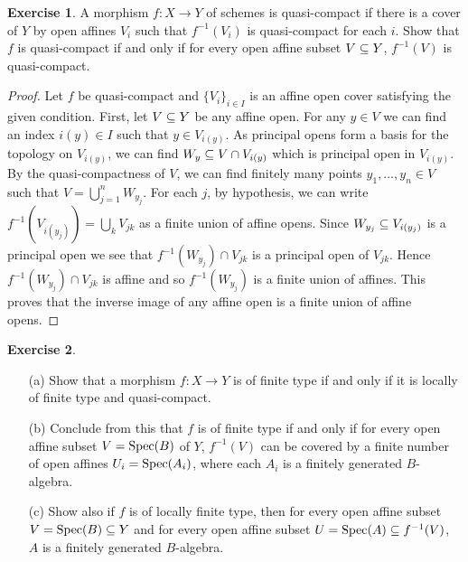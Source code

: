 \documentclass[11pt]{book}
\theoremstyle{definition}
\newtheorem{exercise}{Exercise}[section]
\begin{document}
\begin{exercise}
A morphism $f:X\to Y$ of schemes is quasi-compact if there is a cover of $Y$ by open affines $V_i$ such that $f^{-1}(V_i)$ is quasi-compact for each $i$. Show that $f$ is quasi-compact if and only if for every open affine subset $V\subseteq Y$, $f^{-1}(V)$ is quasi-compact.
\end{exercise}
\begin{proof}
Let $f$ be quasi-compact and $\{V_i\}_{i\in I}$ is an affine open cover satisfying the given condition. First, let $V\subseteq Y$ be any affine open. For any $y\in V$ we can find an index $i(y)\in I$ such that $y\in V_{i(y)}$. As principal opens form a basis for the topology on $V_{i(y)}$, we can find $W_y\subseteq V\cap V_{i(y)}$ which is principal open in $V_{i(y)}$. By the quasi-compactness of $V$, we can find finitely many points $y_1,\dots,y_n\in V$ such that $V=\bigcup_{j=1}^{n}W_{y_j}$. For each $j$, by hypothesis, we can write $f^{-1}(V_{i(y_j)})=\bigcup_kV_{jk}$ as a finite union of affine opens. Since $W_{y_j}\subseteq V_{i(y_j)}$ is a principal open we see that $f^{-1}(W_{y_j})\cap V_{jk}$ is a principal open of $V_{jk}$. Hence $f^{-1}(W_{y_j})\cap V_{jk}$ is affine and so $f^{-1}(W_{y_j})$ is a finite union of affines. This proves that the inverse image of any affine open is a finite union of affine opens.
\end{proof}
\begin{exercise}\label{scheme morphism finite type iff}
\mbox{}
\begin{itemize}
\item[(a)] Show that a morphism $f:X\to Y$ is of finite type if and only if it is locally of finite type and quasi-compact.
\item[(b)] Conclude from this that $f$ is of finite type if and only if for every open affine subset $V=\mathrm{Spec}(B)$ of $Y$, $f^{-1}(V)$ can be covered by a finite number of open affines $U_i=\mathrm{Spec}(A_i)$, where each $A_i$ is a finitely generated $B$-algebra.
\item[(c)] Show also if $f$ is of locally finite type, then for every open affine subset $V=\mathrm{Spec}(B)\subseteq Y$ and for every open affine subset $U=\mathrm{Spec}(A)\subseteq f^{-1}(V)$, $A$ is a finitely generated $B$-algebra.
\end{itemize}
\end{exercise}
\end{document}
